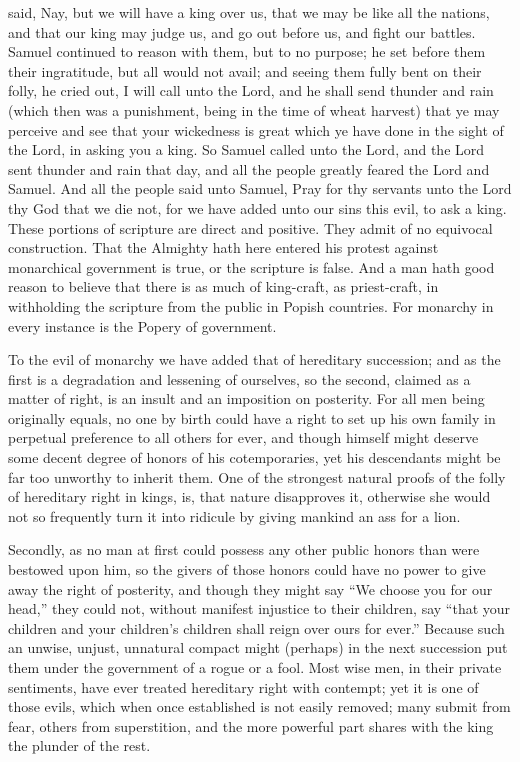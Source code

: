 \documentclass[12pt,oneside]{memoir}
\begin{document}
said, Nay, but we will have a king over us, that we may be like all the nations, and that our king may judge us, and go out before us, and fight our battles. Samuel continued to reason with them, but to no purpose; he set before them their ingratitude, but all would not avail; and seeing them fully bent on their folly, he cried out, I will call unto the Lord, and he shall send thunder and rain (which then was a punishment, being in the time of wheat harvest) that ye may perceive and see that your wickedness is great which ye have done in the sight of the Lord, in asking you a king. So Samuel called unto the Lord, and the Lord sent thunder and rain that day, and all the people greatly feared the Lord and Samuel. And all the people said unto Samuel, Pray for thy servants unto the Lord thy God that we die not, for we have added unto our sins this evil, to ask a king. These portions of scripture are direct and positive. They admit of no equivocal construction. That the Almighty hath here entered his protest against monarchical government is true, or the scripture is false. And a man hath good reason to believe that there is as much of king-craft, as priest-craft, in withholding the scripture from the public in Popish countries. For monarchy in every instance is the Popery of government.

To the evil of monarchy we have added that of hereditary succession; and as the first is a degradation and lessening of ourselves, so the second, claimed as a matter of right, is an insult and an imposition on posterity. For all men being originally equals, no one by birth could have a right to set up his own family in perpetual preference to all others for ever, and though himself might deserve some decent degree of honors of his cotemporaries, yet his descendants might be far too unworthy to inherit them. One of the strongest natural proofs of the folly of hereditary right in kings, is, that nature disapproves it, otherwise she would not so frequently turn it into ridicule by giving mankind an ass for a lion.

Secondly, as no man at first could possess any other public honors than were bestowed upon him, so the givers of those honors could have no power to give away the right of posterity, and though they might say ``We choose you for our head,'' they could not, without manifest injustice to their children, say ``that your children and your children's children shall reign over ours for ever.'' Because such an unwise, unjust, unnatural compact might (perhaps) in the next succession put them under the government of a rogue or a fool. Most wise men, in their private sentiments, have ever treated hereditary right with contempt; yet it is one of those evils, which when once established is not easily removed; many submit from fear, others from superstition, and the more powerful part shares with the king the plunder of the rest.
\end{document}
